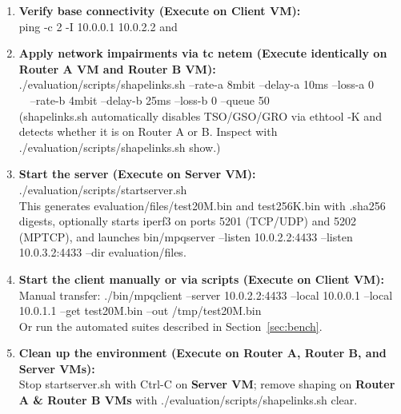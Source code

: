 \documentclass[10pt,a4paper]{article}
\newcommand{\codeul}{\textunderscore\hspace{0pt}}
\DeclareRobustCommand{\code}[1]{{\ttfamily\let\_\codeul #1}}
\begin{document}
\begin{enumerate}
\begin{itemize}
        \item \textbf{Router B VM:} \code{./evaluation/scripts/setup\_addresses.sh router-b <IF\_CLIENT> <IF\_SERVER>}
    \end{itemize}
    \item \textbf{Verify base connectivity (Execute on Client VM):}\\
    \code{ping -c 2 -I 10.0.0.1 10.0.2.2} \quad and \quad \code{ping -c 2 -I 10.0.1.1 10.0.3.2}
    \item \textbf{Apply network impairments via \code{tc netem} (Execute identically on Router A VM and Router B VM):}\\
    \code{./evaluation/\hspace{0pt}scripts/\hspace{0pt}shape\_links.sh --rate-a 8mbit --delay-a 10ms --loss-a 0}\\
    \code{\ \ --rate-b 4mbit --delay-b 25ms --loss-b 0 --queue 50}\\
    (\code{shape\_links.sh} automatically disables TSO/GSO/GRO via \code{ethtool -K} and detects whether it is on Router A or B. Inspect with \code{./evaluation/scripts/shape\_links.sh show}.)
    \item \textbf{Start the server (Execute on Server VM):}\\
    \code{./evaluation/scripts/start\_server.sh}\\
    This generates \code{evaluation/files/test20M.bin} and \code{test256K.bin} with \code{.sha256} digests, optionally starts \code{iperf3} on ports \code{5201} (TCP/UDP) and \code{5202} (MPTCP), and launches \code{bin/mpq\_server --listen 10.0.2.2:4433 --listen 10.0.3.2:4433 --dir evaluation/files}.
    \item \textbf{Start the client manually or via scripts (Execute on Client VM):}\\
    Manual transfer: \code{./bin/mpq\_client --server 10.0.2.2:4433 --local 10.0.0.1 --local 10.0.1.1 --get test20M.bin --out /tmp/test20M.bin}\\
    Or run the automated suites described in Section~\ref{sec:bench}.
    \item \textbf{Clean up the environment (Execute on Router A, Router B, and Server VMs):}\\
    Stop \code{start\_server.sh} with \code{Ctrl-C} on \textbf{Server VM}; remove shaping on \textbf{Router A \& Router B VMs} with \code{./evaluation/scripts/shape\_links.sh clear}.
\end{enumerate}
\end{document}
